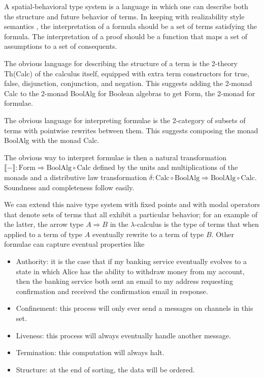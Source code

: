 \documentclass{llncs}
\newcommand{\interp}[1]{\llbracket #1 \rrbracket}
\newcommand{\maps}{\colon}
\newcommand{\Calc}{\mathrm{Calc}}
\newcommand{\BoolAlg}{\mathrm{BoolAlg}}
\renewcommand{\Form}{\mathrm{Form}}
\begin{document}
  A spatial-behavioral type system is a language in which one can
  describe both the structure and future behavior of terms.  In
  keeping with realizability style semantics
  \cite{Krivine-TheCurryHowardCorre}, the interpretation of a formula
  should be a set of terms satisfying the formula. The interpretation
  of a proof should be a function that maps a set of assumptions to a
  set of consequents.

  The obvious language for describing the structure of a term is the 2-theory Th(Calc) of the calculus itself, equipped with extra term constructors for true, false, disjunction, conjunction, and negation.  This suggests adding the 2-monad Calc to the 2-monad BoolAlg for Boolean algebras to get Form, the 2-monad for formulae.

  The obvious language for interpreting formulae is the 2-category of subsets of terms with pointwise rewrites between them.  This suggests composing the monad BoolAlg with the monad Calc.

  The obvious way to interpret formulae is then a natural transformation $\interp{-} \maps \Form \Rightarrow \BoolAlg \circ \Calc$ defined by the units and multiplications of the monads and a distributive law transformation $\delta\maps \Calc \circ \BoolAlg \Rightarrow \BoolAlg \circ \Calc.$  Soundness and completeness follow easily.

  We can extend this naive type system with fixed points and with modal operators that denote sets of terms that all exhibit a particular behavior; for an example of the latter, the arrow type $A \Rightarrow B$ in the $\lambda$-calculus is the type of terms that when applied to a term of type $A$ eventually rewrite to a term of type $B$.  Other formulae can capture eventual properties like
\begin{itemize}
  \item Authority: it is the case that if my banking service eventually evolves to a state in which Alice has the ability to withdraw money from my account, then the banking service both sent an email to my address requesting confirmation and received the confirmation email in response.
  \item Confinement: this process will only ever send a messages on channels in this set.
  \item Liveness: this process will always eventually handle another message.
  \item Termination: this computation will always halt.
  \item Structure: at the end of sorting, the data will be ordered.
\end{itemize}
\end{document}
